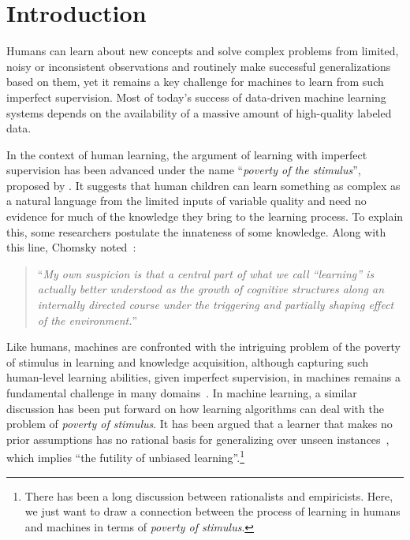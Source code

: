 \chapter{Introduction}
Humans can learn about new concepts and solve complex problems from limited, noisy or inconsistent observations and routinely make successful generalizations based on them, yet it remains a key challenge for machines to learn from such imperfect supervision. Most of today's success of data-driven machine learning systems depends on the availability of a massive amount of high-quality labeled data.

In the context of human learning, the argument of learning with imperfect supervision has been advanced under the name ``\emph{poverty of the stimulus}'', proposed by \citet{chomsky1980rules}. It suggests that human children can learn something as complex as a natural language from the limited inputs of variable quality and need no evidence for much of the knowledge they bring to the learning process. 
To explain this, some researchers postulate the innateness of some knowledge.
Along with this line, Chomsky noted~\citep{chomsky1980rules}:
\begin{quote}
    ``\emph{My own suspicion is that a central part of what we call “learning” is actually better understood as the growth of cognitive structures along an internally directed course under the triggering and partially shaping effect of the environment.}''
\end{quote}

Like humans, machines are confronted with the intriguing problem of the poverty of stimulus in learning and knowledge acquisition, although capturing such human-level learning abilities, given imperfect supervision, in machines remains a fundamental challenge in many domains~\citep{lake2017building}. 
%
In machine learning, a similar discussion has been put forward on how learning algorithms can deal with the problem of \emph{poverty of stimulus}. It has been argued that a learner that makes no prior assumptions has no rational basis for generalizing over unseen instances~\citep{Mitchell:1997:ML}, which implies ``the futility of unbiased learning''.\footnote{There has been a long discussion between rationalists and empiricists. Here, we just want to draw a connection between the process of learning in humans and machines in terms of \emph{poverty of stimulus}.}

